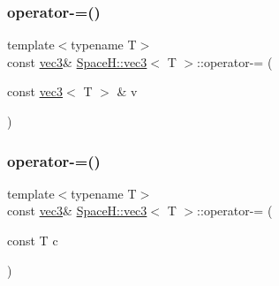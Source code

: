 \mbox{\label{struct_space_h_1_1vec3_a54124bffc816d8dcf912422647bac6c3}} 
\subsubsection{\texorpdfstring{operator-\/=()}{operator-=()}\hspace{0.1cm}{\footnotesize\ttfamily [4/7]}}
{\footnotesize\ttfamily template$<$typename T$>$ \\
const \mbox{\hyperlink{struct_space_h_1_1vec3}{vec3}}\& \mbox{\hyperlink{struct_space_h_1_1vec3}{Space\+H\+::vec3}}$<$ T $>$\+::operator-\/= (\begin{DoxyParamCaption}\item[{const \mbox{\hyperlink{struct_space_h_1_1vec3}{vec3}}$<$ T $>$ \&}]{v }\end{DoxyParamCaption})\hspace{0.3cm}{\ttfamily [inline]}}

\mbox{\label{struct_space_h_1_1vec3_a78f7adf1ccf20819b5c9a536762933e0}} 
\subsubsection{\texorpdfstring{operator-\/=()}{operator-=()}\hspace{0.1cm}{\footnotesize\ttfamily [5/7]}}
{\footnotesize\ttfamily template$<$typename T$>$ \\
const \mbox{\hyperlink{struct_space_h_1_1vec3}{vec3}}\& \mbox{\hyperlink{struct_space_h_1_1vec3}{Space\+H\+::vec3}}$<$ T $>$\+::operator-\/= (\begin{DoxyParamCaption}\item[{const T}]{c }\end{DoxyParamCaption})\hspace{0.3cm}{\ttfamily [inline]}}

\mbox{\label{struct_space_h_1_1vec3_a78f7adf1ccf20819b5c9a536762933e0}} 
